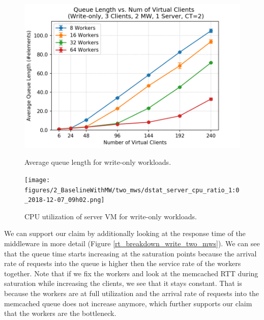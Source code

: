 \begin{figure}[H]
    \begin{minipage}{0.48\textwidth}
        \centering
	    \includegraphics[scale=0.48]{figures/2_BaselineWithMW/two_mws/two_mws_queuelength_write_2018-12-07_09h02.png}
	    \caption{Average queue length for write-only workloads.}
	    \label{queue_length_two_mws_write}
    \end{minipage}\hfill
    \begin{minipage}{0.48\textwidth}
        \centering
	    \texttt{[image: figures/2\_BaselineWithMW/two\_mws/dstat\_server\_cpu\_ratio\_1:0\_2018-12-07\_09h02.png]}
	    \caption{CPU utilization of server VM for write-only workloads.}
	    \label{cpu_two_mws_write}
    \end{minipage}
\end{figure}

We can support our claim by additionally looking at the response time of the middleware in more detail (Figure \ref{rt_breakdown_write_two_mws}). We can see that the queue time starts increasing at the saturation points because the arrival rate of requests into the queue is higher then the service rate of the workers together. Note that if we fix the workers and look at the memcached RTT during saturation while increasing the clients, we see that it stays constant. That is because the workers are at full utilization and the arrival rate of requests into the memcached queue does not increase anymore, which further supports our claim that the workers are the bottleneck. 

